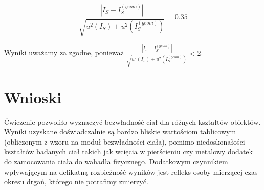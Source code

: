 \documentclass[a4paper,12pts]{article}
\begin{document}
	$$\frac{|I_S - I_S^{(geom)}|}{\sqrt{u^2(I_S) + u^2(I_S^{(geom)})}} = 0.35$$

	Wyniki uważamy za zgodne, ponieważ $\frac{|I_S - I_S^{(geom)}|}{\sqrt{u^2(I_S) + u^2(I_S^{(geom)})}} < 2$. 
	
	\section{Wnioski}
	Ćwiczenie pozwoliło wyznaczyć bezwładność ciał dla różnych kształtów obiektów. Wyniki uzyskane doświadczalnie są bardzo bliskie wartościom tablicowym (obliczonym z wzoru na moduł bezwładności ciała), pomimo niedoskonałości kształtów badanych ciał takich jak wcięcia w pierścieniu czy metalowy dodatek do zamocowania ciała do wahadła fizycznego. Dodatkowym czynnikiem wpływającym na delikatną rozbieżność wyników jest refleks osoby mierzącej czas okresu drgań, którego nie potrafimy zmierzyć.
	
 
\end{document}
